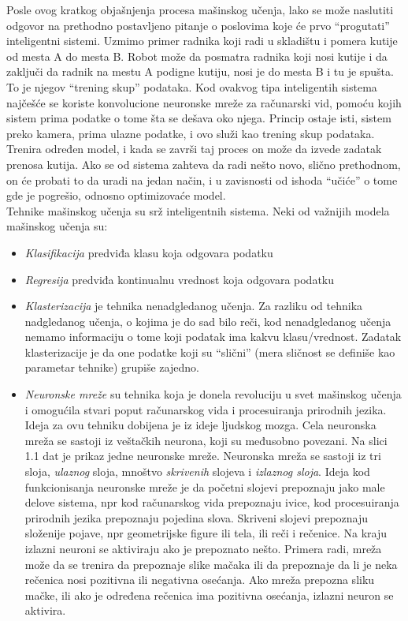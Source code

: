 \documentclass[a4paper,12pt]{report}
\begin{document}
Posle ovog kratkog objašnjenja procesa mašinskog učenja, lako se može naslutiti odgovor na prethodno postavljeno pitanje o poslovima koje će prvo 
\enquote{progutati} inteligentni sistemi. Uzmimo primer radnika koji radi u skladištu i pomera kutije od mesta A do mesta B. Robot može da posmatra radnika koji nosi kutije i da zaključi da radnik na mestu A podigne kutiju, nosi je do mesta B i tu je spušta. To je njegov \enquote{trening skup} podataka. Kod ovakvog tipa inteligentih sistema najčešće se koriste konvolucione neuronske mreže za računarski vid, pomoću kojih sistem prima podatke o tome šta se dešava oko njega. Princip ostaje isti, sistem preko kamera, prima ulazne podatke, i ovo služi kao trening skup podataka. Trenira određen model, i kada se završi taj proces on može da izvede zadatak prenosa kutija. Ako se od sistema zahteva da radi nešto novo, slično prethodnom, on će probati to da uradi na jedan način, i u zavisnosti od ishoda \enquote{učiće} o tome gde je pogrešio, odnosno optimizovaće model. \\

Tehnike mašinskog učenja su srž inteligentnih sistema. Neki od važnijih modela mašinskog učenja su: 
\begin{itemize}
	\item \textit{Klasifikacija} predviđa klasu koja odgovara podatku
	\item \textit{Regresija} predviđa kontinualnu vrednost koja odgovara podatku
	\item \textit{Klasterizacija} je tehnika nenadgledanog učenja. Za razliku od tehnika nadgledanog učenja, o kojima je do sad bilo reči, kod nenadgledanog učenja nemamo informaciju o tome koji podatak ima kakvu klasu/vrednost. Zadatak klasterizacije je da one podatke koji su \enquote{slični} (mera sličnost se definiše kao parametar tehnike) grupiše zajedno.
	\item \textit{Neuronske mreže} su tehnika koja je donela revoluciju u svet mašinskog učenja i omogućila stvari poput računarskog vida i procesuiranja prirodnih jezika. Ideja za ovu tehniku dobijena je iz ideje ljudskog mozga. Cela neuronska mreža se sastoji iz veštačkih neurona, koji su međusobno povezani. Na slici 1.1 dat je prikaz jedne neuronske mreže. Neuronska mreža se sastoji iz tri sloja, \textit{ulaznog} sloja, mnoštvo \textit{skrivenih} slojeva i \textit{izlaznog sloja}. Ideja kod funkcionisanja neuronske mreže je da početni slojevi prepoznaju jako male delove sistema, npr kod računarskog vida prepoznaju ivice, kod procesuiranja prirodnih jezika prepoznaju pojedina slova. Skriveni slojevi prepoznaju složenije pojave, npr geometrijske figure ili tela, ili reči i rečenice. Na kraju izlazni neuroni se aktiviraju ako je prepoznato nešto. Primera radi, mreža može da se trenira da prepoznaje slike mačaka ili da prepoznaje da li je neka rečenica nosi pozitivna ili negativna osećanja. Ako mreža prepozna sliku mačke, ili ako je određena rečenica ima pozitivna osećanja, izlazni neuron se aktivira. 
\end{itemize}
\end{document}
